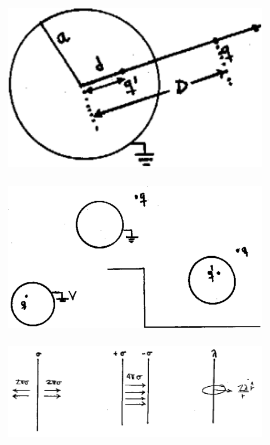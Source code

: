 \documentclass[10pt,oneside]{CBFT_book}
\begin{document}
\begin{figure}[htb]
	\begin{center}
	\includegraphics[width=0.6\textwidth]{images/fig_ft1_green1.pdf}	 
	\end{center}
	\caption{}
\end{figure} 

\begin{figure}[htb]
	\begin{center}
	\includegraphics[width=0.6\textwidth]{images/fig_ft1_green2.pdf}	 
	\end{center}
	\caption{}
\end{figure} 



\begin{figure}[htb]
	\begin{center}
	\includegraphics[width=0.6\textwidth]{images/fig_ft1_campohilos.pdf}	 
	\end{center}
	\caption{}
\end{figure} 


\end{document}

